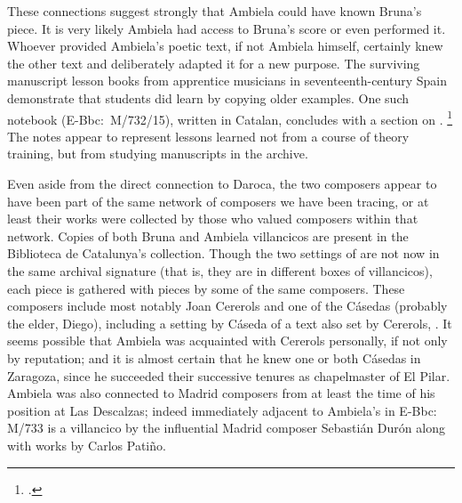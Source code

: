 
These connections suggest strongly that Ambiela could have known Bruna's piece.
It is very likely Ambiela had access to Bruna's score or even performed it.
Whoever provided Ambiela's poetic text, if not Ambiela himself, certainly knew the other text and deliberately adapted it for a new purpose.
The surviving manuscript lesson books from apprentice musicians in seventeenth-century Spain demonstrate that students did learn by copying older examples. 
One such notebook (E-Bbc:~M/732/15), written in Catalan, concludes with a section on .%
	\footnote{%
	.
	}
The notes appear to represent lessons learned not from a course of theory training, but from studying manuscripts in the archive.

Even aside from the direct connection to Daroca, the two composers appear to have been part of the same network of composers we have been tracing, or at least their works were collected by those who valued composers within that network.
Copies of both Bruna and Ambiela villancicos are present in the Biblioteca de Catalunya's collection.
Though the two settings of  are not now in the same archival signature (that is, they are in different boxes of villancicos), each piece is gathered with pieces by some of the same composers.
These composers include most notably Joan Cererols and one of the Cásedas (probably the elder, Diego), including a setting by Cáseda of a text also set by Cererols, .
It seems possible that Ambiela was acquainted with Cererols personally, if not only by reputation; and it is almost certain that he knew one or both Cásedas in Zaragoza, since he succeeded their successive tenures as chapelmaster of El Pilar.
Ambiela was also connected to Madrid composers from at least the time of his position at Las Descalzas; indeed immediately adjacent to Ambiela's  in E-Bbc: M/733 is a villancico by the influential Madrid composer Sebastián Durón along with works by Carlos Patiño.


